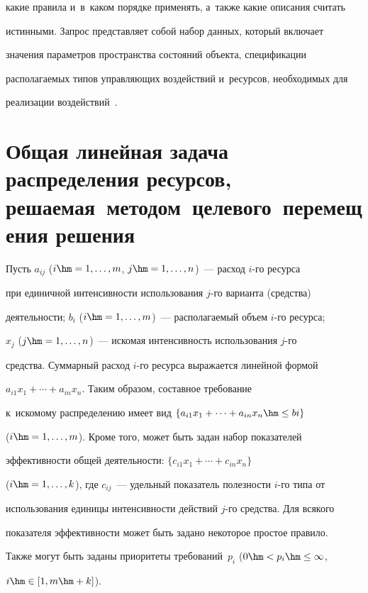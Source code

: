 какие правила и~в~каком порядке применять, а~так\-же какие описания считать 


истинными. За\-прос пред\-став\-ля\-ет собой набор данных, который включает 


значения параметров пространства со\-сто\-яний объекта, спецификации 


располагаемых типов управляющих воздействий и~ресурсов, необходимых для 


реализации воздействий~\cite{21-il}. 





\section{Общая линейная задача распределения ресурсов, решаемая~методом~целевого~перемещения решения}


  


  Пусть $a_{ij}$ ($i\hm=1,\ldots , m$, $j\hm=1,\ldots , n$)~--- расход $i$-го ресурса 


при единичной интенсивности использования $j$-го варианта (средства) 


деятельности; $b_i$ ($i\hm=1,\ldots , m$)~--- рас\-по\-ла\-га\-емый объем $i$-го ресурса; 


$x_j$ ($j\hm=1,\ldots , n$)~--- искомая ин\-тен\-сив\-ность использования $j$-го 


средства. Суммарный расход $i$-го ресурса выражается линейной формой 


$a_{i1}x_1+ \cdots + a_{in}x_n$. Таким образом, составное требование 


к~искомому распределению имеет вид $\{a_{i1}x_1 +\cdots + a_{in}x_n \hm\leq bi\}$ 


($i\hm=1,\ldots , m$). Кроме того, может быть задан набор показателей 


эф\-фек\-тив\-ности общей де\-я\-тель\-ности: $\{c_{i1}x_1 +\cdots +c_{in}x_n\}$ 


($i\hm=1,\ldots , k$), где $c_{ij}$~--- удельный показатель полезности $i$-го типа от 


использования единицы интенсивности действий $j$-го средства. Для всякого 


показателя эф\-фек\-тив\-ности может быть задано некоторое прос\-тое правило. 


Также могут быть заданы приоритеты требований~$p_i$ ($0\hm< p_i \hm\leq \infty$, 


$i\hm\in  [1, m\hm+k]$).


